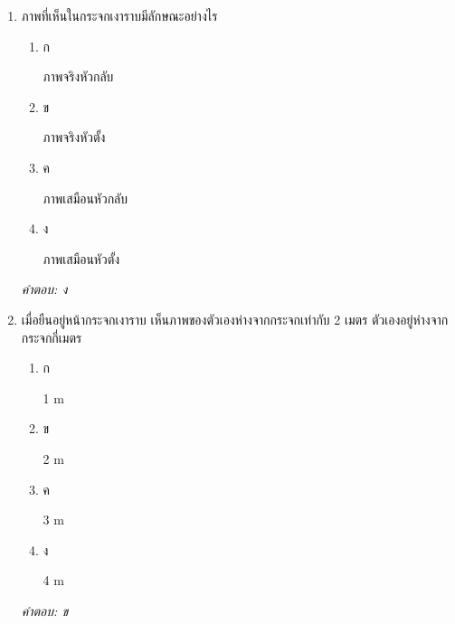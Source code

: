 \documentclass[12pt]{article}
\begin{document}
\begin{enumerate}[label=\arabic*., itemsep=0.5\baselineskip, topsep=0.5\baselineskip, leftmargin=*]
\item ภาพที่เห็นในกระจกเงาราบมีลักษณะอย่างไร
\begin{enumerate}[label=\alph*)., itemsep=0.3\baselineskip, topsep=0.3\baselineskip]
\item ก\ 
\begin{minipage}[t]{0.9\linewidth}
\raggedright ภาพจริงหัวกลับ
\end{minipage}
\item ข\ 
\begin{minipage}[t]{0.9\linewidth}
\raggedright ภาพจริงหัวตั้ง
\end{minipage}
\item ค\ 
\begin{minipage}[t]{0.9\linewidth}
\raggedright ภาพเสมือนหัวกลับ
\end{minipage}
\item ง\ 
\begin{minipage}[t]{0.9\linewidth}
\raggedright ภาพเสมือนหัวตั้ง
\end{minipage}
\end{enumerate}
\vspace{-0.3\baselineskip}
\begin{small}
\textit{คำตอบ: ง}
\end{small}

\item เมื่อยืนอยู่หน้ากระจกเงาราบ เห็นภาพของตัวเองห่างจากกระจกเท่ากับ 2 เมตร ตัวเองอยู่ห่างจากกระจกกี่เมตร
\begin{enumerate}[label=\alph*)., itemsep=0.3\baselineskip, topsep=0.3\baselineskip]
\item ก\ 
\begin{minipage}[t]{0.9\linewidth}
\raggedright 1 m
\end{minipage}
\item ข\ 
\begin{minipage}[t]{0.9\linewidth}
\raggedright 2 m
\end{minipage}
\item ค\ 
\begin{minipage}[t]{0.9\linewidth}
\raggedright 3 m
\end{minipage}
\item ง\ 
\begin{minipage}[t]{0.9\linewidth}
\raggedright 4 m
\end{minipage}
\end{enumerate}
\vspace{-0.3\baselineskip}
\begin{small}
\textit{คำตอบ: ข}
\end{small}


\end{enumerate}
\end{document}
